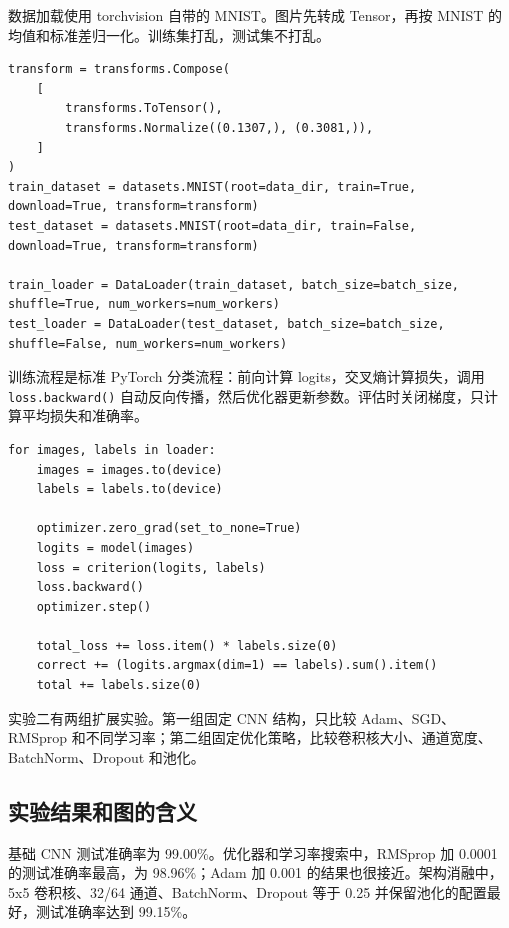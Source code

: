 \documentclass[UTF8]{ctexart}
\begin{document}
数据加载使用 torchvision 自带的 MNIST。图片先转成 Tensor，再按 MNIST 的均值和标准差归一化。训练集打乱，测试集不打乱。

\begin{lstlisting}[caption={实验二：MNIST 数据加载}]
transform = transforms.Compose(
    [
        transforms.ToTensor(),
        transforms.Normalize((0.1307,), (0.3081,)),
    ]
)
train_dataset = datasets.MNIST(root=data_dir, train=True, download=True, transform=transform)
test_dataset = datasets.MNIST(root=data_dir, train=False, download=True, transform=transform)

train_loader = DataLoader(train_dataset, batch_size=batch_size, shuffle=True, num_workers=num_workers)
test_loader = DataLoader(test_dataset, batch_size=batch_size, shuffle=False, num_workers=num_workers)
\end{lstlisting}

训练流程是标准 PyTorch 分类流程：前向计算 logits，交叉熵计算损失，调用 \texttt{loss.backward()} 自动反向传播，然后优化器更新参数。评估时关闭梯度，只计算平均损失和准确率。

\begin{lstlisting}[caption={实验二：训练一个 epoch}]
for images, labels in loader:
    images = images.to(device)
    labels = labels.to(device)

    optimizer.zero_grad(set_to_none=True)
    logits = model(images)
    loss = criterion(logits, labels)
    loss.backward()
    optimizer.step()

    total_loss += loss.item() * labels.size(0)
    correct += (logits.argmax(dim=1) == labels).sum().item()
    total += labels.size(0)
\end{lstlisting}

实验二有两组扩展实验。第一组固定 CNN 结构，只比较 Adam、SGD、RMSprop 和不同学习率；第二组固定优化策略，比较卷积核大小、通道宽度、BatchNorm、Dropout 和池化。

\subsection{实验结果和图的含义}
基础 CNN 测试准确率为 99.00\%。优化器和学习率搜索中，RMSprop 加 0.0001 的测试准确率最高，为 98.96\%；Adam 加 0.001 的结果也很接近。架构消融中，5x5 卷积核、32/64 通道、BatchNorm、Dropout 等于 0.25 并保留池化的配置最好，测试准确率达到 99.15\%。

\begin{table}[H]
\centering
\caption{CNN 优化器与学习率搜索 Top 配置}

\end{table}
\end{document}
